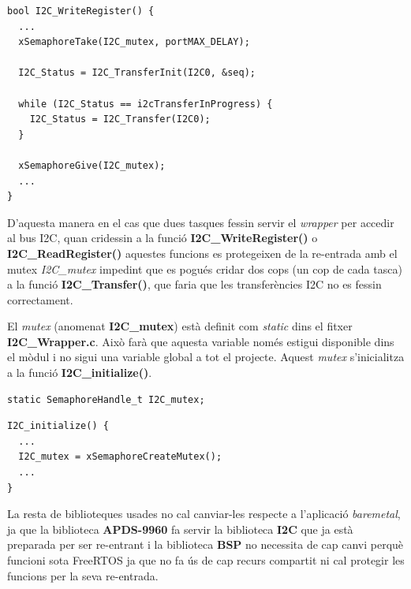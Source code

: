 \begin{lstlisting}[style=customc,caption={Part de la funció I2C\_WriteRegister() adaptada a FreeRTOS}, label=I2CWriteRegisterFreeRTOS]
bool I2C_WriteRegister() {
  ...
  xSemaphoreTake(I2C_mutex, portMAX_DELAY);

  I2C_Status = I2C_TransferInit(I2C0, &seq);

  while (I2C_Status == i2cTransferInProgress) {
    I2C_Status = I2C_Transfer(I2C0);
  }

  xSemaphoreGive(I2C_mutex);
  ...
}
\end{lstlisting}

D'aquesta manera en el cas que dues tasques fessin servir el {\em wrapper} per accedir al bus \gls{I2C}, quan cridessin a la funció {\bf I2C\_WriteRegister()} o {\bf I2C\_ReadRegister()} aquestes funcions es protegeixen de la re-entrada amb el mutex {\em I2C\_mutex} impedint que es pogués cridar dos cops (un cop de cada tasca) a la funció {\bf I2C\_Transfer()}, que faria que les transferències \gls{I2C} no es fessin correctament.

El {\em mutex} (anomenat {\bf I2C\_mutex}) està definit com {\em static} dins el fitxer {\bf I2C\_Wrapper.c}. Això farà que aquesta variable només estigui disponible dins el mòdul i no sigui una variable global a tot el projecte. Aquest {\em mutex} s'inicialitza a la funció {\bf I2C\_initialize()}.

\begin{lstlisting}[style=customc,label=I2CMutex]
static SemaphoreHandle_t I2C_mutex;
\end{lstlisting}



\begin{lstlisting}[style=customc,label=CreateI2CMutex]
I2C_initialize() {
  ...
  I2C_mutex = xSemaphoreCreateMutex();
  ...
}
\end{lstlisting}

La resta de biblioteques usades no cal canviar-les respecte a l'aplicació {\em baremetal}, ja que la biblioteca {\bf APDS-9960} fa servir la biblioteca {\bf I2C} que ja està preparada per ser re-entrant i la biblioteca {\bf BSP} no necessita de cap canvi perquè funcioni sota FreeRTOS ja que no fa ús de cap recurs compartit ni cal protegir les funcions per la seva re-entrada.

